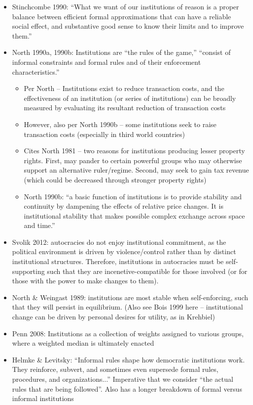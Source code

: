 \documentclass[12pt]{article}
\begin{document}
\begin{itemize}
    \item Stinchcombe 1990: ``What we want of our institutions of reason is a proper balance between efficient formal approximations that can have a reliable social effect, and substantive good sense to know their limits and to improve them.''
    \item North 1990a, 1990b: Institutions are ``the rules of the game,'' ``consist of informal constraints and formal rules and of their enforcement characteristics.''
    \begin{itemize}
        \item Per North -- Institutions exist to reduce transaction costs, and the effectiveness of an institution (or series of institutions) can be broadly measured by evaluating its resultant reduction of transaction costs
        \item However, also per North 1990b -- some institutions seek to raise transaction costs (especially in third world countries)
        \item Cites North 1981 -- two reasons for institutions producing lesser property rights. First, may pander to certain powerful groups who may otherwise support an alternative ruler/regime. Second, may seek to gain tax revenue (which could be decreased through stronger property rights)
        \item North 1990b: ``a basic function of institutions is to provide stability and continuity by dampening the effects of relative price changes. It is institutional stability that makes possible complex exchange across space and time.''
    \end{itemize}
    \item Svolik 2012: autocracies do not enjoy institutional commitment, as the political environment is driven by violence/control rather than by distinct institutional structures. Therefore, institutions in autocracies must be self-supporting such that they are incenetive-compatible for those involved (or for those with the power to make changes to them).
    \item North \& Weingast 1989: institutions are most stable when self-enforcing, such that they will persist in equilibrium. (Also see Bois 1999 here -- institutional change can be driven by personal desires for utility, as in Krehbiel)
    \item Penn 2008: Institutions as a collection of weights assigned to various groups, where a weighted median is ultimately enacted
    \item Helmke \& Levitsky: ``Informal rules shape how democratic institutions work. They reinforce, subvert, and sometimes even supersede formal rules, procedures, and organizations...'' Imperative that we consider ``the actual rules that are being followed''. Also has a longer breakdown of formal versus informal institutions

\end{itemize}
\end{document}
